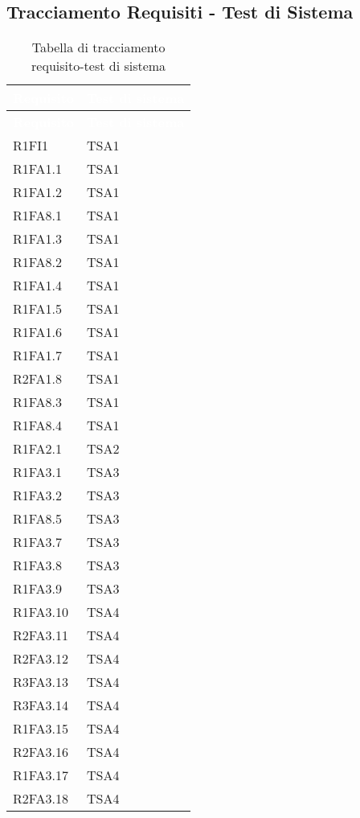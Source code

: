 \subsection{Tracciamento Requisiti - Test di Sistema}
{
\renewcommand{\arraystretch}{1.5}
\centering
\begin{longtable}{C{4cm} C{4cm}}
\caption{Tabella di tracciamento requisito-test di sistema}\\
\textcolor{white}{\textbf{Requisito}} & \textcolor{white}{\textbf{Test di sistema}}\\	
\endfirsthead
{}
\textcolor{white}{\textbf{Requisito}} & \textcolor{white}{\textbf{Test di sistema}}\\	
\endhead

R1FI1 & TSA1  \\
R1FA1.1 & TSA1  \\
R1FA1.2 & TSA1  \\
R1FA8.1 & TSA1  \\
R1FA1.3 & TSA1  \\
R1FA8.2 & TSA1  \\
R1FA1.4 & TSA1  \\
R1FA1.5 & TSA1  \\
R1FA1.6 & TSA1  \\
R1FA1.7 & TSA1  \\
R2FA1.8 & TSA1  \\
R1FA8.3 & TSA1  \\
R1FA8.4 & TSA1  \\

R1FA2.1 & TSA2  \\

R1FA3.1 & TSA3  \\
R1FA3.2 & TSA3  \\
R1FA8.5 & TSA3  \\
R1FA3.7 & TSA3  \\
R1FA3.8 & TSA3  \\
R1FA3.9 & TSA3  \\

R1FA3.10 & TSA4  \\
R2FA3.11 & TSA4  \\
R2FA3.12 & TSA4  \\
R3FA3.13 & TSA4  \\
R3FA3.14 & TSA4  \\
R1FA3.15 & TSA4  \\
R2FA3.16 & TSA4  \\
R1FA3.17 & TSA4  \\
R2FA3.18 & TSA4  \\


\end{longtable}}
